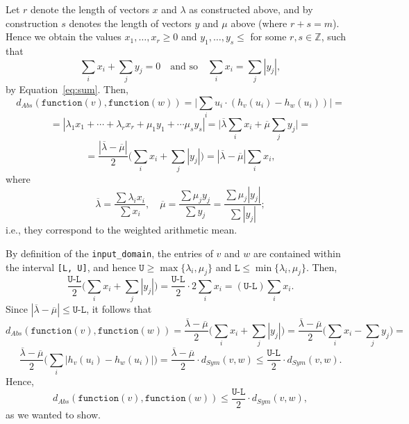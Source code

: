 \documentclass[11pt,a4paper]{article}
\theoremstyle{definition}
\newcommand{\function}{\texttt{function}}
\begin{document}
Let $r$ denote the length of vectors $x$ and $\lambda$ as constructed above, and by construction $s$ denotes the length of vectors $y$ and $\mu$ above (where $r+s = m$). Hence we obtain the values $x_1, \ldots, x_r \geq 0$ and $y_1, \ldots, y_s \leq$ for some $r, s \in \mathbb{Z}$, such that
\[
    \sum_i x_i + \sum_j y_j = 0 \quad \textrm{and so} \quad \sum_i x_i = \sum_j |y_j|,
\]
by Equation~\ref{eq:sum}. Then,
\[
    d_{Abs}(\function(v), \function(w)) = \Big|\sum_i u_i \cdot (h_v(u_i) - h_w(u_i))\Big| =
\]
\[
    = |\lambda_1 x_1 + \cdots + \lambda_r x_r + \mu_1 y_1 + \cdots \mu_s y_s| = \Big|\overline{\lambda} \sum_i x_i + \overline{\mu} \sum_j y_j\Big| = 
\]
\[
    = \dfrac{|\overline{\lambda} - \overline{\mu}|}{2} \Big(\sum_i x_i + \sum_j |y_j|\Big) = |\overline{\lambda} - \overline{\mu}| \sum_i x_i,
\]  
where
\[
    \overline{\lambda} = \dfrac{\sum \lambda_i x_i}{\sum x_i}, \quad \overline{\mu} = \dfrac{\sum \mu_j y_j}{\sum y_j} = \dfrac{\sum \mu_j |y_j|}{\sum |y_j|};
\]
i.e., they correspond to the weighted arithmetic mean. 

By definition of the \texttt{input\_domain}, the entries of $v$ and $w$ are contained within the interval \texttt{[L, U]}, and hence $\texttt{U} \geq \max\{\lambda_i, \mu_j\}$ and $\texttt{L} \leq \min\{\lambda_i, \mu_j\}$. Then,
\[
    \dfrac{\texttt{U-L}}{2} \Big(\sum_i x_i + \sum_j |y_j|\Big) = \dfrac{\texttt{U-L}}{2} \cdot 2 \sum_i x_i = (\texttt{U-L}) \sum_i x_i.
\]
Since $|\overline{\lambda} - \overline{\mu}| \leq \texttt{U-L}$, it follows that
\[
    d_{Abs}(\function(v), \function(w)) = \dfrac{\overline{\lambda}-\overline{\mu}}{2}\Big(\sum_i x_i + \sum_j |y_j|\Big) = \dfrac{\overline{\lambda}-\overline{\mu}}{2}\Big(\sum_i x_i - \sum_j y_j\Big) =
\]
\[
    \dfrac{\overline{\lambda}-\overline{\mu}}{2} \Big(\sum_i |h_v(u_i) - h_w(u_i)| \Big) = \dfrac{\overline{\lambda}-\overline{\mu}}{2} \cdot d_{Sym}(v, w) \leq \dfrac{\texttt{U-L}}{2} \cdot d_{Sym}(v, w).
\]
Hence,
\[
    d_{Abs}(\function(v), \function(w)) \leq \dfrac{\texttt{U-L}}{2} \cdot d_{Sym}(v, w),
\]
as we wanted to show.
\end{document}
